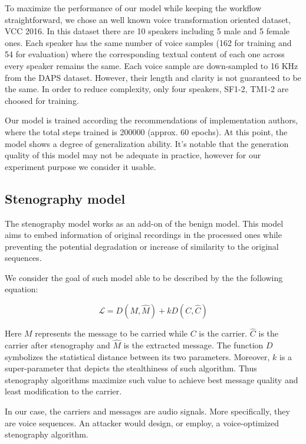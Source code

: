 \documentclass[journal]{IEEEtran} %
\begin{document}
To maximize the performance of our model while keeping the workflow straightforward, we chose an well known voice transformation oriented dataset, VCC 2016. In this dataset there are 10 speakers including 5 male and 5 female ones. Each speaker has the same number of voice samples (162 for training and 54 for evaluation) where the corresponding textual content of each one across every speaker remains the same. Each voice sample are down-sampled to 16 KHz from the DAPS dataset. However, their length and clarity is not guaranteed to be the same. In order to reduce complexity, only four speakers, SF1-2, TM1-2 are choosed for training.

Our model is trained according the recommendations of implementation authors, where the total steps trained is 200000 (approx. 60 epochs). At this point, the model shows a degree of generalization ability. It's notable that the generation quality of this model may not be adequate in practice, however for our experiment purpose we consider it usable.

\subsection{Stenography model}

The stenography model works as an add-on of the benign model. This model aims to embed information of original recordings in the processed ones while preventing the potential degradation or increase of similarity to the original sequences.

We consider the goal of such model able to be described by the the following equation:

\begin{equation}
    \label{eqn:st_q_loss}
    \mathcal{L} = D( M , \hat{M} ) + k D( C , \hat{C} )
\end{equation}

Here $M$ represents the message to be carried while $C$ is the carrier. $\hat{C}$ is the carrier after stenography and $\hat{M}$ is the extracted message. The function $D$ symbolizes the statistical distance between its two parameters. Moreover, $k$ is a super-parameter that depicts the stealthiness of such algorithm. Thus stenography algorithms maximize such value to achieve best message quality and least modification to the carrier.

In our case, the carriers and messages are audio signals. More specifically, they are voice sequences. An attacker would design, or employ, a voice-optimized stenography algorithm. 
\end{document}
